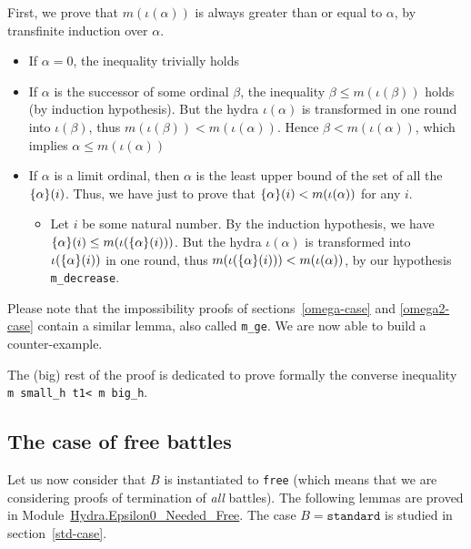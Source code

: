 First, we prove that $m(\iota(\alpha))$ is always greater than or equal to $\alpha$, by  transfinite induction over $\alpha$.




\begin{itemize}
\item If $\alpha=0$, the inequality trivially holds
\item If $\alpha$ is the successor of  some ordinal $\beta$, the inequality $\beta \leq m(\iota(\beta))$ holds (by induction hypothesis). But the hydra $\iota(\alpha)$ is transformed in one round into 
$\iota(\beta)$, thus $m(\iota(\beta))<m(\iota(\alpha))$. Hence $\beta<m(\iota(\alpha))$, which implies $\alpha \leq m(\iota(\alpha))$
\item If $\alpha$ is a limit ordinal, then $\alpha$ is the least upper bound of the set
of all  the $\mbox{$\{\alpha\}(i)$}$.  Thus, we have just to prove that $\mbox{$\{\alpha\}(i)$}< m(\iota(\alpha))$ for any $i$. 
\begin{itemize}
\item Let $i$ be some natural number.
By the induction hypothesis, we have $\mbox{$\{\alpha\}(i)$} \leq m(\iota(\mbox{$\{\alpha\}(i)$}))$. But the hydra $\iota(\alpha)$ is transformed into $\iota(\mbox{$\{\alpha\}(i)$})$ in one round, thus $m(\iota(\mbox{$\{\alpha\}(i)$})) < m(\iota(\alpha))$, by our hypothesis \texttt{m\_decrease}.
\end{itemize}
\end{itemize}

Please note that the impossibility proofs of 
sections~\vref{omega-case} and \vref{omega2-case} contain a similar lemma, also called \texttt{m\_ge}.
We are now able to build a counter-example.



The (big) rest of the proof is dedicated to prove formally the converse inequality 
\texttt{m small\_h t1< m big\_h}. 



\subsection{The case of free battles}
\label{sec:free-battles-case}
Let us now consider that $B$ is instantiated to \texttt{free} (which means that we are considering proofs of termination of \emph{all} battles). The following lemmas are proved in Module~\href{../theories/html/hydras.Hydra.Epsilon0_Needed_Free.html}{Hydra.Epsilon0\_Needed\_Free}.
The case $B=\texttt{standard}$ is studied in section~\vref{std-case}.


